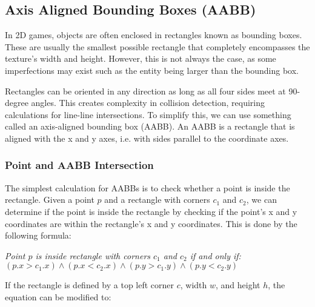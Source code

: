 \subsection{Axis Aligned Bounding Boxes (AABB)}
In 2D games, objects are often enclosed in rectangles known as bounding boxes.
These are usually the smallest possible rectangle that completely encompasses
the texture's width and height. However, this is not always the case, as some
imperfections may exist such as the entity being larger than the bounding box.

Rectangles can be oriented in any direction as long as all four sides meet at
90-degree angles. This creates complexity in collision detection, requiring
calculations for line-line intersections. To simplify this, we can use
something called an axis-aligned bounding box (AABB). An AABB is a rectangle
that is aligned with the x and y axes, i.e. with sides parallel to the
coordinate axes.

\subsubsection{Point and AABB Intersection}

The simplest calculation for AABBs is to check whether a point is inside the
rectangle. Given a point $p$ and a rectangle with corners $c_1$ and $c_2$, we
can determine if the point is inside the rectangle by checking if the point's x
and y coordinates are within the rectangle's x and y coordinates. This is done
by the following formula:
\begin{center}
    \textit{Point $p$ is inside rectangle with corners $c_1$ and $c_2$ if and only if:} \\
    $(p.x > c_1.x) \land (p.x < c_2.x) \land (p.y > c_1.y) \land (p.y < c_2.y)$
\end{center}

If the rectangle is defined by a top left corner $c$, width $w$, and height
$h$, the equation can be modified to:

